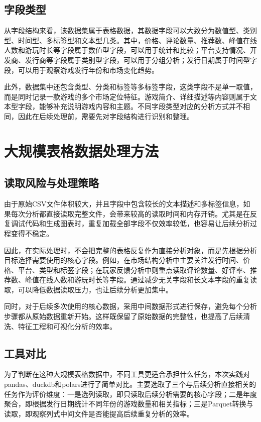 \documentclass[UTF8,a4paper,12pt,fontset=fandol]{ctexart}
\begin{document}
\subsection{字段类型}
从字段结构来看，该数据集属于表格数据，其数据字段可以大致分为数值型、类别型、时间型、多标签型和文本型几类。其中，价格、评论数量、推荐数、峰值在线人数和游玩时长等字段属于数值型字段，可以用于统计和比较；平台支持情况、开发商、发行商等字段属于类别型字段，可以用于分组分析；发行日期属于时间型字段，可以用于观察游戏发行年份和市场变化趋势。

此外，数据集中还包含类型、分类和标签等多标签字段，这类字段不是单一取值，而是同时记录一款游戏的多个市场定位特征。游戏简介、详细描述等内容则属于文本型字段，能够补充说明游戏内容和主题。不同字段类型对应的分析方式并不相同，因此在后续处理前，需要先对字段结构进行识别和整理。

\section{大规模表格数据处理方法}

\subsection{读取风险与处理策略}
由于原始CSV文件体积较大，并且字段中包含较长的文本描述和多标签信息，如果每次分析都直接读取完整文件，会带来较高的读取时间和内存开销。尤其是在反复调试代码和生成图表时，重复加载全部字段不仅效率较低，也容易让后续分析过程变得不稳定。

因此，在实际处理时，不会把完整的表格反复作为直接分析对象，而是先根据分析目标选择需要使用的核心字段。例如，在市场结构分析中主要关注发行时间、价格、平台、类型和标签字段；在玩家反馈分析中则重点读取评论数量、好评率、推荐数、峰值在线人数和游玩时长等字段。通过减少无关字段和长文本字段的重复读取，可以降低数据读取压力，也让后续分析更加集中。

同时，对于后续多次使用的核心数据，采用中间数据形式进行保存，避免每个分析步骤都从原始数据重新开始。这样既保留了原始数据的完整性，也提高了后续清洗、特征工程和可视化分析的效率。

\subsection{工具对比}
为了判断在这种大规模表格数据中，不同工具更适合承担什么任务，本次实践对pandas、duckdb和polars进行了简单对比。主要选取了三个与后续分析直接相关的任务作为评价维度：一是选列读取，即只读取后续分析需要的核心字段；二是年度聚合，即根据发行日期统计不同年份的游戏数量和相关指标；三是Parquet转换与读取，即观察列式中间文件是否能提高后续重复分析的效率。
\end{document}
